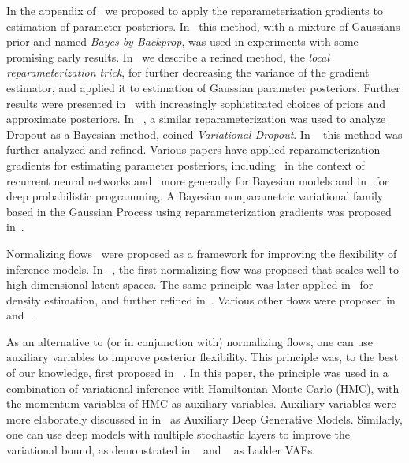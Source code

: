 \documentclass[MAL,biber]{nowfnt} %
\begin{document}
In the appendix of~\citep{kingma2013auto} we proposed to apply the reparameterization gradients to estimation of parameter posteriors. In~\citep{blundell2015weight} this method, with a mixture-of-Gaussians prior and named \emph{Bayes by Backprop}, was used in experiments with some promising early results. In~\citep{kingma2015variational} we describe a refined method, the \emph{local reparameterization trick}, for further decreasing the variance of the gradient estimator, and applied it to estimation of Gaussian parameter posteriors. Further results were presented in~\citep{louizos2017bayesian,louizos2017multiplicative,louizos2016structured} with increasingly sophisticated choices of priors and approximate posteriors. In ~\citep{kingma2015variational,gal2016theoretically}, a similar reparameterization was used to analyze Dropout as a Bayesian method, coined \emph{Variational Dropout}. In ~\citep{molchanov2017variational} this method was further analyzed and refined. Various papers have applied reparameterization gradients for estimating parameter posteriors, including~\citep{fortunato2017bayesian} in the context of recurrent neural networks and~\citep{kucukelbir2016automatic} more generally for Bayesian models and in~\citep{tran2017deep} for deep probabilistic programming. A Bayesian nonparametric variational family based in the Gaussian Process using reparameterization gradients was proposed in~\citep{tran2015variational}.

Normalizing flows~\citep{rezende2015variational} were proposed as a framework for improving the flexibility of inference models. In ~\cite{kingma2016improving}, the first normalizing flow was proposed that scales well to high-dimensional latent spaces. The same principle was later applied in~\citep{papamakarios2017masked} for density estimation, and further refined in~\citep{huang2018neural}. Various other flows were proposed in~\citep{tomczak2016improving,tomczak2017improving} and ~\citep{berg2018sylvester}.

As an alternative to (or in conjunction with) normalizing flows, one can use auxiliary variables to improve posterior flexibility. This principle was, to the best of our knowledge, first proposed in ~\cite{salimans2015markov}. In this paper, the principle was used in a combination of variational inference with Hamiltonian Monte Carlo (HMC), with the momentum variables of HMC as auxiliary variables. Auxiliary variables were more elaborately discussed in in~\citep{maaloe2016auxiliary} as Auxiliary Deep Generative Models. Similarly, one can use deep models with multiple stochastic layers to improve the variational bound, as demonstrated in ~\citep{sonderby2016train} and ~\citep{sonderby2016ladder} as Ladder VAEs.
\end{document}
